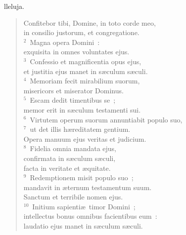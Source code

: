 \bchapter
{}lleluja. \begin{flushleft}\begin{verse}\vspace{6pt}Confitebor tibi, Domine, in toto corde meo,\\ in consilio justorum, et congregatione.\\
${}^{2}$~Magna opera Domini~:\\ exquisita in omnes voluntates ejus.\\
${}^{3}$~Confessio et magnificentia opus ejus,\\ et justitia ejus manet in s\ae culum s\ae culi.\\
${}^{4}$~Memoriam fecit mirabilium suorum,\\ misericors et miserator Dominus.\\
${}^{5}$~Escam dedit timentibus se~;\\ memor erit in s\ae culum testamenti sui.\\
${}^{6}$~Virtutem operum suorum annuntiabit populo suo,\\
${}^{7}$~ut det illis h\ae reditatem gentium.\\ Opera manuum ejus veritas et judicium.\\
${}^{8}$~Fidelia omnia mandata ejus,\\ confirmata in s\ae culum s\ae culi,\\ facta in veritate et \ae quitate.\\
${}^{9}$~Redemptionem misit populo suo~;\\ mandavit in \ae ternum testamentum suum.\\ Sanctum et terribile nomen ejus.\\
${}^{10}$~Initium sapienti\ae\ timor Domini~;\\ intellectus bonus omnibus facientibus eum~:\\ laudatio ejus manet in s\ae culum s\ae culi.\end{verse}\end{flushleft}



